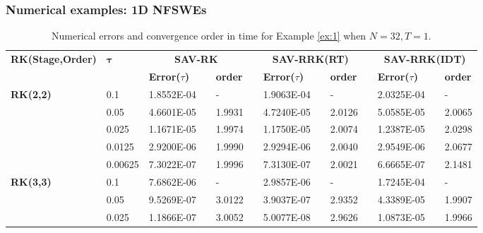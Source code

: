 \documentclass[aspectratio=169]{beamer}
\begin{document}
	\begin{frame}\frametitle{Numerical examples: 1D NFSWEs}
	\begin{table}[H]\tiny
	  \centering
	  \caption{Numerical errors and convergence order in time for Example \ref{ex:1} when $N=32, T = 1$.}
	  \begin{tabular}{lllllrlrlrlrlrl}
	  \toprule
	  \multicolumn{2}{l}{\multirow{2}[3]{*}{\textbf{RK(Stage,Order)}}} & \multicolumn{2}{l}{\multirow{2}[3]{*}{$\bm{\tau}$}} & \multicolumn{3}{c}{\textbf{SAV-RK}} &       & \multicolumn{3}{c}{\textbf{SAV-RRK(RT)}} &       & \multicolumn{3}{c}{\textbf{SAV-RRK(IDT)}} \\
	  \cmidrule{5-7}\cmidrule{9-11}\cmidrule{13-15}    \multicolumn{2}{l}{} & \multicolumn{2}{l}{} & \textbf{Error($\tau$)} &       & \textbf{order} &       & \textbf{Error($\tau$)} &       & \textbf{order} &       & \textbf{Error($\tau$)} &       & \textbf{order} \\
	  \hline
	  \multicolumn{2}{l}{\multirow{5}[0]{*}{\textbf{RK(2,2)}}} & \multicolumn{2}{l}{0.1} & 1.8552E-04 &       & -     &       & 1.9063E-04 &       & -     &       & 2.0325E-04 &       & - \\
	  \multicolumn{2}{l}{} & \multicolumn{2}{l}{0.05} & 4.6601E-05 &       & 1.9931  &       & 4.7240E-05 &       & 2.0126  &       & 5.0585E-05 &       & 2.0065  \\
	  \multicolumn{2}{l}{} & \multicolumn{2}{l}{0.025} & 1.1671E-05 &       & 1.9974  &       & 1.1750E-05 &       & 2.0074  &       & 1.2387E-05 &       & 2.0298  \\
	  \multicolumn{2}{l}{} & \multicolumn{2}{l}{0.0125} & 2.9200E-06 &       & 1.9990  &       & 2.9294E-06 &       & 2.0040  &       & 2.9549E-06 &       & 2.0677  \\
	  \multicolumn{2}{l}{} & \multicolumn{2}{l}{0.00625} & 7.3022E-07 &       & 1.9996  &       & 7.3130E-07 &       & 2.0021  &       & 6.6665E-07 &       & 2.1481  \\
	  \multicolumn{2}{l}{\multirow{5}[0]{*}{\textbf{RK(3,3)}}} & \multicolumn{2}{l}{0.1} & 7.6862E-06 &       & -     &       & 2.9857E-06 &       & -     &       & 1.7245E-04 &       & - \\
	  \multicolumn{2}{l}{} & \multicolumn{2}{l}{0.05} & 9.5269E-07 &       & 3.0122  &       & 3.9037E-07 &       & 2.9352  &       & 4.3389E-05 &       & 1.9907  \\
	  \multicolumn{2}{l}{} & \multicolumn{2}{l}{0.025} & 1.1866E-07 &       & 3.0052  &       & 5.0077E-08 &       & 2.9626  &       & 1.0873E-05 &       & 1.9966  \\

\end{tabular}
\end{table}
\end{frame}
\end{document}
